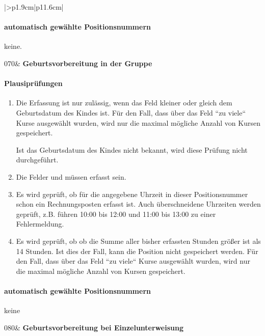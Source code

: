 \begin{mpsupertabular}{|>{\centering}p{1.9cm}|p{11.6cm}|}
\paragraph{automatisch gewählte Positionsnummern}
keine.
\\ \hline


070&
\textbf{Geburtsvorbereitung in der Gruppe}
\paragraph{Plausiprüfungen}
\begin{enumerate}
\item
Die Erfassung ist nur zulässig, wenn das Feld  kleiner 
oder gleich dem Geburtsdatum des Kindes ist. 
Für den Fall, dass über das Feld  ``zu viele``
Kurse ausgewählt wurden, wird nur die maximal mögliche Anzahl von Kursen
gespeichert. 

Ist das Geburtsdatum des
Kindes nicht bekannt, wird diese Prüfung nicht durchgeführt.
\item
Die Felder  und  müssen erfasst sein.
\item
Es wird geprüft, ob für die angegebene Uhrzeit in dieser Positionsnummer
schon ein Rechnungsposten erfasst ist. Auch überschneidene Uhrzeiten
werden geprüft, z.B. führen 10:00 bis 12:00 und 11:00 bis 13:00 zu einer
Fehlermeldung.
\item
Es wird geprüft, ob ob die Summe aller bisher erfassten Stunden größer
ist als 14 Stunden. Ist dies der Fall, kann die Position nicht gespeichert
werden. Für den Fall, dass über das Feld  ``zu viele``
Kurse ausgewählt wurden, wird nur die maximal mögliche Anzahl von Kursen
gespeichert.
\end{enumerate}
\paragraph{automatisch gewählte Positionsnummern}
keine
\\ \hline


080&
\textbf{Geburtsvorbereitung bei Einzelunterweisung}

\end{mpsupertabular}
